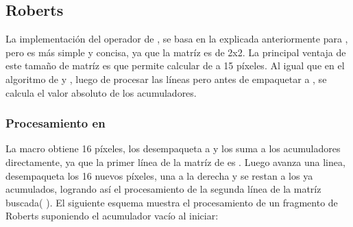 \subsection{Roberts}
La implementación del operador de , se basa en la explicada anteriormente para , pero es más simple y concisa, 
ya que la matríz es de 2x2. La principal ventaja de este tamaño de matríz es que permite calcular de a 15 píxeles. Al igual que en el algoritmo 
de  y , luego de procesar las líneas pero antes de empaquetar a , se calcula el valor absoluto 
de los acumuladores.

\subsubsection{Procesamiento en }	
	La macro  obtiene 16 píxeles, los desempaqueta a  y los suma a los acumuladores directamente, ya que la
primer línea de la matríz de  es 
. Luego avanza una linea, desempaqueta los 16 nuevos píxeles,  una  a la derecha y se restan a los ya acumulados, 
logrando así el procesamiento de la segunda línea de la matríz buscada(
). El siguiente esquema muestra el procesamiento de un fragmento de Roberts suponiendo el acumulador vacío al iniciar:

\begin{center}
\end{center}

